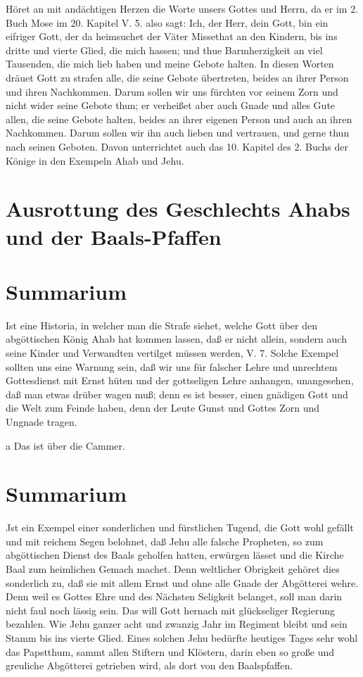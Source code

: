 Höret an mit andächtigen Herzen die Worte unsers Gottes und Herrn, da er im 2. Buch Mose im 20. Kapitel V. 5. also sagt: Ich, der Herr, dein Gott, bin ein eifriger Gott, der da heimsuchet der Väter Missethat an den Kindern, bis ins dritte und vierte Glied, die mich hassen; und thue Barmherzigkeit an viel Tausenden, die mich lieb haben und meine Gebote halten. In diesen Worten dräuet Gott zu strafen alle, die seine Gebote übertreten, beides an ihrer Person und ihren Nachkommen. Darum sollen wir uns fürchten vor seinem Zorn und nicht wider seine Gebote thun; er verheißet aber auch Gnade und alles Gute allen, die seine Gebote halten, beides an ihrer eigenen Person und auch an ihren Nachkommen. Darum sollen wir ihn auch lieben und vertrauen, und gerne thun nach seinen Geboten. Davon unterrichtet auch das 10. Kapitel des 2. Buchs der Könige in den Exempeln Ahab und Jehu.

\section{Ausrottung des Geschlechts Ahabs und der Baals-Pfaffen}

\section{Summarium}

Ist eine Historia, in welcher man die Strafe siehet, welche Gott über den abgöttischen König Ahab hat kommen lassen, daß er nicht allein, sondern auch seine Kinder und Verwandten vertilget müssen werden, V. 7. Solche Exempel sollten uns eine Warnung sein, daß wir uns für falscher Lehre und unrechtem Gottesdienst mit Ernst hüten und der gottseligen Lehre anhangen, unangesehen, daß man etwas drüber wagen muß; denn es ist besser, einen gnädigen Gott und die Welt zum Feinde haben, denn der Leute Gunst und Gottes Zorn und Ungnade tragen.

a Das ist über die Cammer.

\section{Summarium}

Jst ein Exempel einer sonderlichen und fürstlichen Tugend, die Gott wohl gefällt und mit reichem Segen belohnet, daß Jehu alle falsche Propheten, so zum abgöttischen Dienst des Baals geholfen hatten, erwürgen lässet und die Kirche Baal zum heimlichen Gemach machet. Denn weltlicher Obrigkeit gehöret dies sonderlich zu, daß sie mit allem Ernst und ohne alle Gnade der Abgötterei wehre. Denn weil es Gottes Ehre und des Nächsten Seligkeit belanget, soll man darin nicht faul noch lässig sein. Das will Gott hernach mit glückseliger Regierung bezahlen. Wie Jehu ganzer acht und zwanzig Jahr im Regiment bleibt und sein Stamm bis ins vierte Glied. Eines solchen Jehu bedürfte heutiges Tages sehr wohl das Papstthum, sammt allen Stiftern und Klöstern, darin eben so große und greuliche Abgötterei getrieben wird, als dort von den Baalspfaffen.

